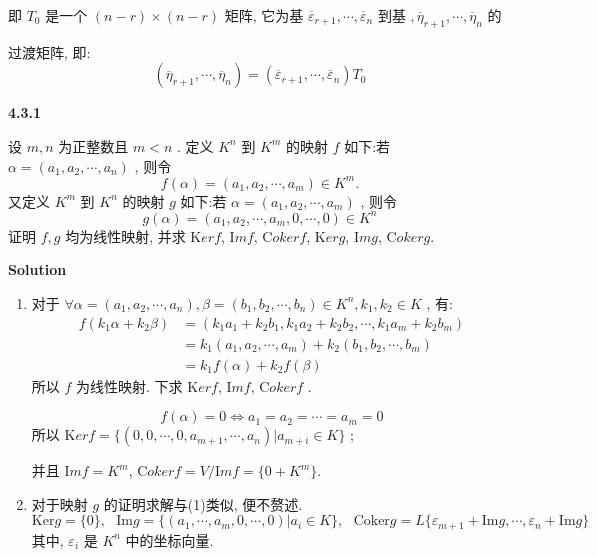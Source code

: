 \documentclass[11pt,a4paper,openany,oneside]{book}
\newcommand{\Ker}{\mathrm Ker}
\newcommand{\Image}{\mathrm Im}
\newcommand{\Coker}{\mathrm Coker}
\newcommand\Solution{\noindent\textbf{\textsf{Solution}}\par\medskip}
\begin{document}
即 $ T_0 $ 是一个 $ (n-r)\times(n-r) $ 矩阵, 它为基 $  \overline{\varepsilon}_{r+1}, \cdots, \overline{\varepsilon}_n  $ 到基 $  ,  \overline{\eta}_{r+1}, \cdots, \overline{\eta}_n  $ 的

过渡矩阵, 即:
 $$  (\overline{\eta}_{r+1}, \cdots, \overline{\eta}_{n}) = (\overline{\varepsilon}_{r+1}, \cdots, \overline{\varepsilon}_{n})T_0  $$  

\begin{myexample}
	\textbf{4.3.1}

设 $ m,n $ 为正整数且 $ m<n $ . 定义 $ K^n $ 到 $ K^m $ 的映射 $ f $ 如下:若 $ \alpha = (a_1, a_2, \cdots, a_n) $ , 则令
 $$  f(\alpha) = (a_1, a_2, \cdots, a_m) \in K^m.  $$ 
又定义 $ K^m $ 到 $ K^n $ 的映射 $ g $ 如下:若 $ \alpha = (a_1, a_2, \cdots, a_m) $ , 则令
 $$  g(\alpha) = (a_1, a_2, \cdots, a_m, 0, \cdots, 0) \in K^n  $$ 
证明 $ f,g $ 均为线性映射, 并求  $\Ker f $,  $\Image f $,  $\Coker f $,  $\Ker g $, $\Image g $, $\Coker g $. 
\end{myexample}
\Solution 
\begin{enumerate}[(1)]
	\item 对于 $ \forall \alpha=(a_1, a_2, \cdots, a_n), \beta=(b_1, b_2, \cdots, b_n) \in K^n, k_1, k_2 \in K $ , 有:
	\begin{align*}
	f(k_1\alpha + k_2\beta) &= (k_1a_1+k_2b_1, k_1a_2+k_2b_2, \cdots, k_1a_m+k_2b_m) \\
	&= k_1(a_1, a_2, \cdots, a_m) + k_2(b_1, b_2, \cdots, b_m) \\
	&= k_1f(\alpha) + k_2f(\beta) 
	\end{align*}
	所以 $ f $ 为线性映射. 下求 $\Ker f$, $\Image f $, $\Coker f $ . 
	
	$$  f(\alpha)=0  \Leftrightarrow a_1 = a_2 = \cdots = a_m = 0  $$ 
	所以 $\Ker f= \{(0,0,\cdots, 0, a_{m+1}, \cdots, a_n) | a_{m+i} \in K \} $ ;
	
	并且 $\Image f = K^m $, $\Coker f = V/\Image f = \{ 0 + K^m\} $.  
	
	\item 对于映射 $ g $ 的证明求解与(1)类似, 便不赘述.
	$$   \mathrm{Ker} g = \{ 0 \}, \ \ \  \mathrm{Im} g = \{(a_1, \cdots, a_m, 0, \cdots, 0)|a_i \in K \}, \ \ \   \mathrm{Coker} g = L \{ \varepsilon_{m+1}+ \mathrm{Im} g, \cdots, \varepsilon_n +  \mathrm{Im} g \}  $$  
	其中,  $ \varepsilon_i $ 是 $ K^n $ 中的坐标向量. \\  \\  \\
\end{enumerate}
\end{document}
